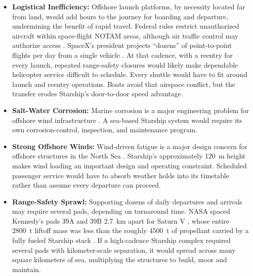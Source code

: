 \documentclass{article}
\begin{document}
\begin{itemize}
Distance is what makes it quiet, and the plane keeps flying to get it. On jet engines at about \SI{900}{\kilo\meter\per\hour}, an hour of cruise buys \SI{900}{\kilo\meter}. Almost every large inland city has somewhere nearly empty inside that circle. Chicago reaches the national forests of northern Wisconsin and the middle of Lake Superior in about 40 minutes. Atlanta reaches open Atlantic past Savannah in about 30. Chongqing crosses the mountains west of Chengdu onto the Tibetan Plateau, and Delhi has the Himalaya about \SI{350}{\kilo\meter} north. In each case the empty ground sits near the heading the destination wants anyway, so the detour costs jet fuel and minutes rather than rocket propellant. A pad \SI{30}{\kilo\meter} off New York Harbor still has all of New York City inside \SI{60}{\kilo\meter}. The middle of Lake Superior has nobody inside \SI{60}{\kilo\meter}. The same noise, moved somewhere almost nobody lives, is a better outcome than the coastal case it replaces, not merely an equal one.
\item \textbf{Logistical Inefficiency:} Offshore launch platforms, by necessity located far from land, would add hours to the journey for boarding and departure, undermining the benefit of rapid travel. Federal rules restrict unauthorized aircraft within space-flight NOTAM areas, although air traffic control may authorize access \cite{cfr_91_143}. SpaceX's president projects ``dozens'' of point-to-point flights per day from a single vehicle \cite{shotwell_ted_2018}. At that cadence, with a reentry for every launch, repeated range-safety closures would likely make dependable helicopter service difficult to schedule. Every shuttle would have to fit around launch and reentry operations. Boats avoid that airspace conflict, but the transfer erodes Starship's door-to-door speed advantage.
\item \textbf{Salt-Water Corrosion:} Marine corrosion is a major engineering problem for offshore wind infrastructure \cite{wind_turbine_corrosion}. A sea-based Starship system would require its own corrosion-control, inspection, and maintenance program.
\item \textbf{Strong Offshore Winds:} Wind-driven fatigue is a major design concern for offshore structures in the North Sea \cite{north_sea_wind_fatigue}. Starship's approximately \SI{120}{\meter} height \cite{starship} makes wind loading an important design and operating constraint. Scheduled passenger service would have to absorb weather holds into its timetable rather than assume every departure can proceed.
\item \textbf{Range-Safety Sprawl:} Supporting dozens of daily departures and arrivals may require several pads, depending on turnaround time. NASA spaced Kennedy's pads 39A and 39B \SI{2.7}{\kilo\meter} apart for Saturn V \cite{nasa_sp29_1963}, whose entire \SI{2800}{\tonne} liftoff mass \cite{nasa_saturn_v_overview} was less than the roughly \SI{4500}{\tonne} of propellant carried by a fully fueled Starship stack \cite{gunter_starship}. If a high-cadence Starship complex required several pads with kilometer-scale separation, it would spread across many square kilometers of sea, multiplying the structures to build, moor and maintain.


\end{itemize}
\end{document}
